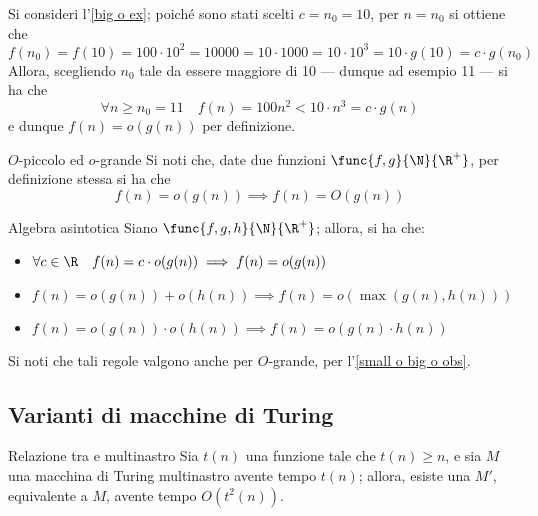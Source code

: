 \documentclass[a4paper, 12pt]{report}
\begin{document}
    \begin{example}[$o$-piccolo]
        Si consideri l'\cref{big o ex}; poiché sono stati scelti $c = n_0 = 10$, per $n = n_0$ si ottiene che $$f(n_0) = f(10) = 100 \cdot 10^2 = 10000 = 10 \cdot 1000 = 10 \cdot 10^3 = 10 \cdot g(10) = c \cdot g(n_0)$$ Allora, scegliendo $n_0$ tale da essere maggiore di 10 --- dunque ad esempio 11 --- si ha che $$\forall n \ge n_0 = 11 \quad f(n) = 100 n^2 < 10 \cdot n^3 = c \cdot g(n)$$ e dunque $f(n) = o(g(n))$ per definizione.
    \end{example}

    \begin{framedobs}[label={small o big o obs}]{$O$-piccolo ed $o$-grande}
        Si noti che, date due funzioni $\func{f,g}{\N}{\R^+}$, per definizione stessa si ha che $$f(n) = o(g(n)) \implies f(n)= O(g(n))$$
    \end{framedobs}

    \begin{framedprop}[label={alg asintotica}]{Algebra asintotica}
        Siano $\func{f, g, h}{\N}{\R^+}$; allora, si ha che:
        
        \begin{itemize}
            \item $\forall c \in \R \quad f(n) = c \cdot o(g(n)) \implies f(n) = o(g(n))$
            \item $f(n) = o(g(n)) + o(h(n)) \implies f(n) = o(\max(g(n), h(n)))$
            \item $f(n) = o(g(n)) \cdot o(h(n)) \implies f(n) = o(g(n) \cdot h(n))$
        \end{itemize}

        Si noti che tali regole valgono anche per $O$-grande, per l'\cref{small o big o obs}.
    \end{framedprop}

    \subsection{Varianti di macchine di Turing}

    \begin{framedthm}{Relazione tra \TM e \TM multinastro}
        Sia $t(n)$ una funzione tale che $t(n) \ge n$, e sia $M$ una macchina di Turing multinastro avente tempo $t(n)$; allora, esiste una \TM $M'$, equivalente a $M$, avente tempo $O(t^2(n))$.
    \end{framedthm}
\end{document}
